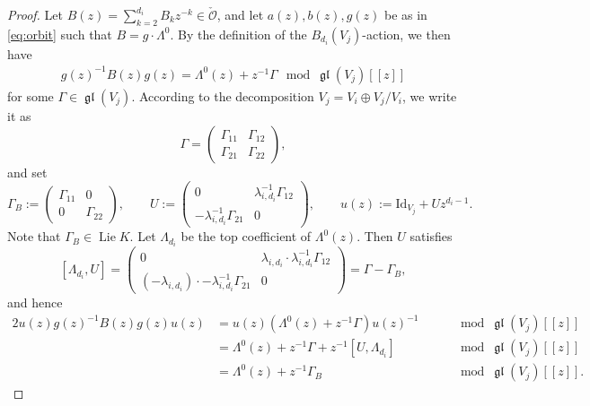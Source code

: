 \documentclass[pdftex]{sigma}
\numberwithin{equation}{section}
\theoremstyle{definition}
\newcommand{\gl}{\operatorname{\mathfrak{gl}}}
\newcommand{\Lie}{\operatorname{Lie}} %
\newcommand{\unit}{\mathrm{Id}}
\newcommand{\bO}{\mathcal{O}}
\begin{document}
\begin{proof}
Let $B(z)=\sum\limits_{k=2}^{d_i} B_k z^{-k} \in \check{\bO}$,
and let $a(z),b(z),g(z)$ be as in \eqref{eq:orbit} such that
$B=g \cdot \Lambda^0$.
By the def\/inition of the $B_{d_i}(V_j)$-action, we then have
\begin{gather}\label{eq:residue1}
g(z)^{-1}B(z)g(z) = \Lambda^0(z) + z^{-1}\Gamma
\mod \gl(V_j)[[z]]
\end{gather}
for some $\Gamma \in \gl(V_j)$.
According to the decomposition $V_j = V_i \oplus V_j/V_i$,
we write it as
\[
\Gamma =
\begin{pmatrix}
\Gamma_{11} & \Gamma_{12} \\ \Gamma_{21} & \Gamma_{22}
\end{pmatrix},
\]
and set
\[
\Gamma_B :=
\begin{pmatrix}
\Gamma_{11} & 0 \\ 0 & \Gamma_{22}
\end{pmatrix},\qquad
U :=
\begin{pmatrix}
0 & \lambda_{i,d_i}^{-1}\Gamma_{12} \\ -\lambda_{i,d_i}^{-1}\Gamma_{21} & 0
\end{pmatrix},\qquad
u(z) := \unit_{V_j} + U z^{d_i-1}.
\]
Note that $\Gamma_B \in \Lie K$.
Let $\Lambda_{d_i}$ be the top coef\/f\/icient of $\Lambda^0(z)$.
Then $U$ satisf\/ies
\[
[ \Lambda_{d_i}, U ] =
\begin{pmatrix}
0 & \lambda_{i,d_i} \cdot \lambda_{i,d_i}^{-1}\Gamma_{12} \\
(-\lambda_{i,d_i}) \cdot -\lambda_{i,d_i}^{-1}\Gamma_{21} & 0
\end{pmatrix}
= \Gamma - \Gamma_B,
\]
and hence
\begin{alignat*}{2}
u(z) g(z)^{-1}B(z)g(z)u(z)
&=
u(z) (\Lambda^0(z) + z^{-1}\Gamma)u(z)^{-1}
&\quad &\mod \gl(V_j)[[z]] \\
&= \Lambda^0(z) +z^{-1}\Gamma + z^{-1}[U,\Lambda_{d_i}]
&\quad &\mod \gl(V_j)[[z]] \\
&= \Lambda^0(z) +z^{-1}\Gamma_B
&\quad &\mod \gl(V_j)[[z]].
\end{alignat*}


\end{proof}
\end{document}

